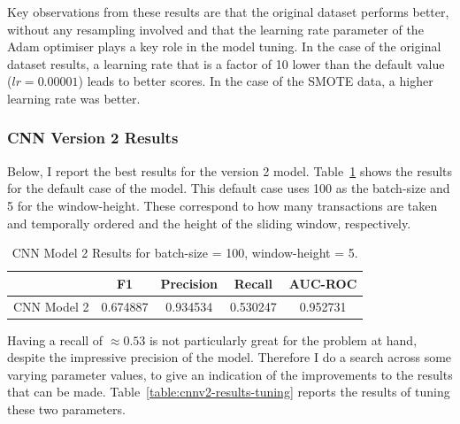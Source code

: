 \documentclass[12pt,a4paper,twoside]{report}
\begin{document}
Key observations from these results are that the original dataset performs better, without any resampling involved and that the learning rate parameter of the Adam optimiser plays a key role in the model tuning. In the case of the original dataset results, a learning rate that is a factor of 10 lower than the default value ($lr = 0.00001$) leads to better scores. In the case of the SMOTE data, a higher learning rate was better. 


\subsubsection{CNN Version 2 Results}

Below, I report the best results for the version 2 model. Table~\ref{table:cnnv2-results-original} shows the results for the default case of the model. This default case uses 100 as the batch-size and 5 for the window-height. These correspond to how many transactions are taken and temporally ordered and the height of the sliding window, respectively. 

\begin{table}[H]  
  \centering
  \begin{tabular}{ccccc}
    \toprule
           		& F1 & Precision & Recall & AUC-ROC \\ \midrule
    CNN Model 2 & 0.674887 & 0.934534 & 0.530247 & 0.952731  \\
 
   \bottomrule
 \end{tabular}
 \caption{CNN Model 2 Results for batch-size = 100, window-height = 5.}
\label{table:cnnv2-results-original}
\end{table}

Having a recall of $ \approx0.53 $ is not particularly great for the problem at hand, despite the impressive precision of the model. Therefore I do a search across some varying parameter values, to give an indication of the improvements to the results that can be made. Table~\ref{table:cnnv2-results-tuning} reports the results of tuning these two parameters.
\end{document}
